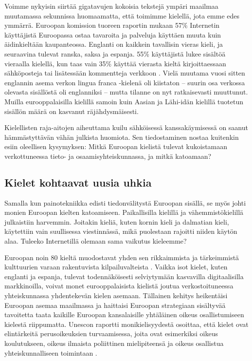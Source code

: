 \begin{multicols}{2}
Voimme nykyisin siirtää gigatavujen kokoisia tekstejä ympäri maailmaa muutamassa sekunnissa huomaamatta, että toimimme kielellä, jota emme edes ymmärrä. Euroopan komission tuoreen raportin mukaan 57\% Internetin käyttäjistä Euroopassa ostaa tavaroita ja palveluja käyttäen muuta kuin äidinkieltään kaupanteossa. Englanti on kaikkein tavallisin vieras kieli, ja seuraavina tulevat ranska, saksa ja espanja. 55\% käyttäjistä lukee sisältöä vieraalla kielellä, kun taas vain 35\% käyttää vierasta kieltä kirjoittaessaan sähköposteja tai lisätessään kommentteja verkkoon \cite{EC-prefer}. Vielä muutama vuosi sitten englannin asema verkon lingua franca -kielenä oli kiistaton -- suurin osa verkossa olevasta sisällöstä oli englanniksi -- mutta tilanne on nyt ratkaisevasti muuttunut. Muilla eurooppalaisilla kielillä samoin kuin Aasian ja Lähi-idän kielillä tuotetun sisällön määrä on kasvanut räjähdysmäisesti.

Kielellisten raja-aitojen aiheuttama kuilu sähköisessä kanssakäymisessä on saanut hämmästyttävän vähän julkista huomiota. Sen tiedostaminen nostaa kuitenkin esiin oleellisen kysymyksen: Mitkä Euroopan kielistä tulevat kukoistamaan verkottuneessa tieto- ja osaamisyhteiskunnassa, ja mitkä katoamaan?

\subsection{Kielet kohtaavat uusia uhkia}

Samalla kun painotekniikka edisti tiedonvälitystä Euroopan sisällä, se myös johti monien Euroopan kielten katoamiseen.  Paikallisilla kielillä ja vähemmistökielillä julkaistiin harvemmin. Joitakin kieliä, kuten kornin kieli ja dalmatian kieli, käytettiin vain suullisessa viestinnässä, mikä puolestaan rajoitti niiden käytön alaa. Tuleeko Internetillä olemaan sama vaikutus kieleemme?


Euroopan noin 80 kieltä muodostavat yhden sen rikkaimmista ja tärkeimmistä kulttuurien varaan rakentuvista kilpailuvalteista \cite{EC-multi}. Vaikka isot kielet, kuten englanti ja espanja, tulevat todennäköisesti selviytymään kasvavilla digitaalisilla markkinoilla, voivat monet eurooppalaisista kielistä joutua verkostoituneessa yhteiskunnassa yhdentekevän kielen asemaan. Tällainen kehitys heikentäisi Euroopan asemaa maailmassa ja haittaisi Euroopan strategiaan sisältyvää tavoitetta taata kaikille Euroopan kansalaisille yhtäläinen oikeus osallistumiseen kielestä riippumatta.  Unescon raportti monikielisyydestä osoittaa, että kielet ovat elintärkeitä perusoikeuksien turvaamisessa, joita ovat esimerkiksi oikeus koulutukseen, oikeus ilmaista poliittinen mielipiteensä ja oikeus osallistua yhteiskunnalliseen toimintaan \cite{UN-mid}.


\end{multicols}
